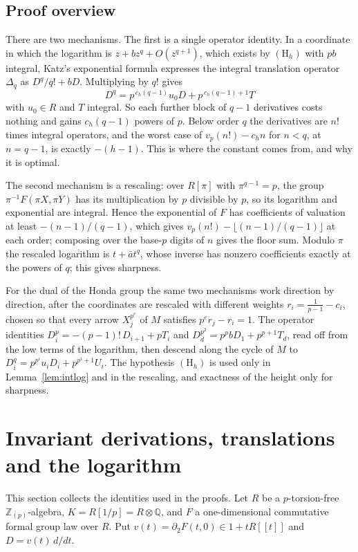 \documentclass[11pt]{amsart}
\theoremstyle{definition}
\theoremstyle{remark}
\newcommand{\Z}{\mathbb Z}
\newcommand{\Q}{\mathbb Q}
\newcommand{\vp}{v_p}
\begin{document}
\subsection{Proof overview}
There are two mechanisms. The first is a single operator identity. In a coordinate in which the logarithm is $z+bz^q+O(z^{q+1})$, which exists by $(\mathrm H_h)$ with $pb$ integral, Katz's exponential formula expresses the integral translation operator $\Delta_q$ as $D^q/q!+bD$. Multiplying by $q!$ gives
\[
 D^q=p^{\,c_h(q-1)}u_0D+p^{\,c_h(q-1)+1}T
\]
with $u_0\in R$ and $T$ integral. So each further block of $q-1$ derivatives costs nothing and gains $c_h(q-1)$ powers of $p$. Below order $q$ the derivatives are $n!$ times integral operators, and the worst case of $\vp(n!)-c_hn$ for $n<q$, at $n=q-1$, is exactly $-(h-1)$. This is where the constant comes from, and why it is optimal.

The second mechanism is a rescaling: over $R[\pi]$ with $\pi^{q-1}=p$, the group $\pi^{-1}F(\pi X,\pi Y)$ has its multiplication by $p$ divisible by $p$, so its logarithm and exponential are integral. Hence the exponential of $F$ has coefficients of valuation at least $-(n-1)/(q-1)$, which gives $\vp(n!)-\lfloor (n-1)/(q-1)\rfloor$ at each order; composing over the base-$p$ digits of $n$ gives the floor sum. Modulo $\pi$ the rescaled logarithm is $t+\bar at^q$, whose inverse has nonzero coefficients exactly at the powers of $q$; this gives sharpness.

For the dual of the Honda group the same two mechanisms work direction by direction, after the coordinates are rescaled with different weights $r_i=\frac1{p-1}-c_i$, chosen so that every arrow $X_j^{p^e}$ of $M$ satisfies $p^er_j-r_i=1$. The operator identities $D_i^p=-(p-1)!\,D_{i+1}+pT_i$ and $D_d^{p^2}=p^pbD_1+p^{p+1}T_d$, read off from the low terms of the logarithm, then descend along the cycle of $M$ to $D_i^q=p^{p^i}u_iD_i+p^{p^i+1}U_i$. The hypothesis $(\mathrm H_h)$ is used only in Lemma~\ref{lem:intlog} and in the rescaling, and exactness of the height only for sharpness.

\section{Invariant derivations, translations and the logarithm}\label{sec:prelim}

This section collects the identities used in the proofs. Let $R$ be a $p$-torsion-free $\Z_{(p)}$-algebra, $K=R[1/p]=R\otimes\Q$, and $F$ a one-dimensional commutative formal group law over $R$. Put $v(t)=\partial_2F(t,0)\in1+tR[[t]]$ and $D=v(t)\,d/dt$.
\end{document}
